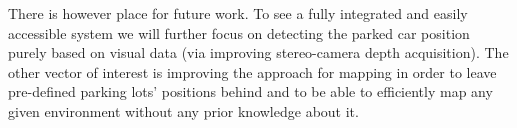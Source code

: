     There is however place for future work. To see a fully integrated and
    easily accessible system we will further focus on detecting the parked car
    position purely based on visual data (via improving stereo-camera depth
    acquisition). The other vector of interest is improving the approach for
    mapping in order to leave pre-defined parking lots' positions behind and
    to be able to efficiently map any given environment without any prior
    knowledge about it.

